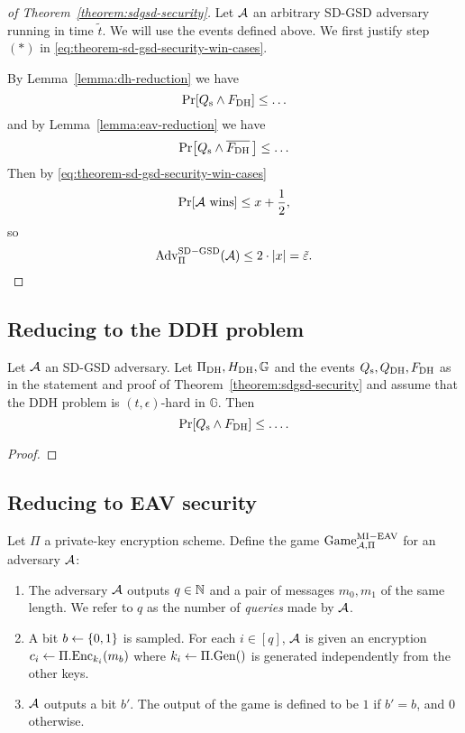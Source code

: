 \begin{proof}[of Theorem~\ref{theorem:sdgsd-security}]
	Let $\adv$ an arbitrary SD-GSD adversary running in time $\tilde{t}$. We will use the events defined above. We first justify step $(*)$ in \eqref{eq:theorem-sd-gsd-security-win-cases}.


	By Lemma~\vref{lemma:dh-reduction} we have
	\[
		\pr{\qs \land \fdh} \le \ldots
	\]
	and by Lemma~\vref{lemma:eav-reduction} we have
	\[
		\pr{\qs \land \overline{\fdh}\,} \le \ldots
	\]
	Then by \eqref{eq:theorem-sd-gsd-security-win-cases}
	\[
		\pr{\wins} \le x + \frac{1}{2},
	\] so
	\[
		\mathrm{Adv}_{\Pi}^{\mathrm{SD-GSD}}(\adv) \le 2 \cdot \abs*{x} = \tilde{\epsilon}.
	\]
\end{proof}

\subsection{Reducing to the DDH problem}

\begin{lemma} \label{lemma:dh-reduction}
	Let $\adv$ an SD-GSD adversary. Let $\dhies, \hdh, \mathbb{G}$ and the events $\qs, \qdh, \fdh$ as in the statement and proof of Theorem~\vref{theorem:sdgsd-security} and assume that the DDH problem is $(t, \epsilon)$-hard in $\mathbb{G}$. Then
	\[
		\pr{\qs \land \fdh} \le \ldots.
	\]
\end{lemma}
\begin{proof}
\end{proof}

\subsection{Reducing to EAV security}


\begin{definition}
	Let $\Pi$ a private-key encryption scheme. Define the game $\mathrm{Game}_{\adv, \Pi}^{\mathrm{MI-EAV}}$ for an adversary $\adv$:
	\begin{enumerate}[1.]
		\item The adversary $\adv$ outputs $q \in \N$ and a pair of messages $m_0, m_1$ of the same length. We refer to $q$ as the number of \emph{queries} made by $\adv$.
		\item A bit $b \from \{0, 1\}$ is sampled. For each $i \in [q]$, $\adv$ is given an encryption $c_i \from \Pi.\enc_{k_i}(m_b)$ where $k_i \from \Pi.\gen()$ is generated independently from the other keys.
		\item $\adv$ outputs a bit $b'$. The output of the game is defined to be $1$ if $b' = b$, and $0$ otherwise.
	\end{enumerate}
\end{definition}

